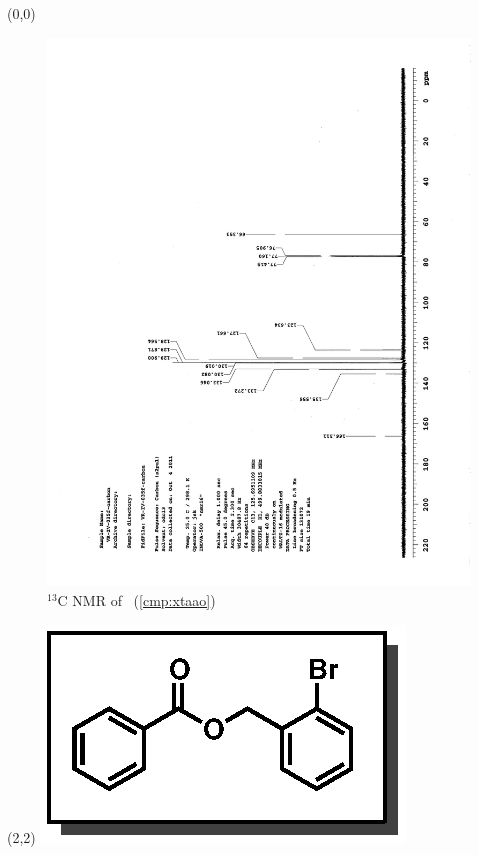 \clearpage
\begin{textblock}{20}(0,0)
\begin{figure}[htb]
\caption{$^{13}$C NMR of  \CMPxtaao\ (\ref{cmp:xtaao})}
\includegraphics[scale=0.75, trim = 0mm 0mm 0mm 5mm,
clip]{chp_asymmetric/images/nmr/xtaaoC}
\vspace{-100pt}
\end{figure}
\end{textblock}
\begin{textblock}{1}(2,2)
\includegraphics[scale=0.8, angle=90]{chp_asymmetric/images/xtaao}
\end{textblock}
\clearpage

